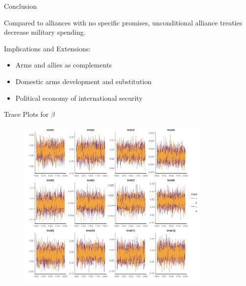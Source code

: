 \documentclass{beamer}
\begin{document}
\begin{frame}{Conclusion}

Compared to alliances with no specific promises, unconditional alliance treaties decrease military spending.

\pause

Implications and Extensions:
\pause
\begin{itemize}
\item Arms and allies as complements
\pause
\item Domestic arms development and substitution
\pause
\item Political economy of international security
\end{itemize}

\end{frame}



\appendix 



\begin{frame}{Trace Plots for $\beta$}

\begin{figure}
	\centering
		\includegraphics[width=0.85\textwidth]{beta trace.png}
	\label{fig:beta trace}
\end{figure}


\end{frame}

\end{document}
